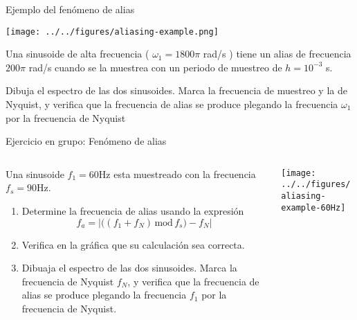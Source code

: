 \documentclass[presentation,aspectratio=169]{beamer}
\begin{document}
\begin{frame}[label={sec:orga9a082d}]{Ejemplo del fenómeno de alias}
\begin{center}
\texttt{[image: ../../figures/aliasing-example.png]}
\end{center}
Una sinusoide de alta frecuencia ( \(\omega_1 = 1800\pi\) rad/s ) tiene un alias de frecuencia  \(200 \pi\) rad/s cuando se la muestrea con un periodo de muestreo de \(h=10^{-3}\) s.

\alert{Dibuja el espectro de las dos sinusoides. Marca la frecuencia de muestreo y la de Nyquist, y verifica que la frecuencia de alias se produce plegando la frecuencia \(\omega_1\) por la frecuencia de Nyquist}
\end{frame}

\begin{frame}[label={sec:org74bef20}]{Ejercicio en grupo: Fenómeno de alias}
\begin{columns}
\begin{column}{0.4\columnwidth}
Una sinusoide \(f_1=60\)Hz esta muestreado con la frecuencia \(f_s=90\)Hz.

\begin{enumerate}
\item Determine la frecuencia de alias usando la expresión
\[ f_a = \left| \big( (f_1 + f_N) \, \text{mod}\, f_s\big) - f_N\right|\]
\item Verifica en la gráfica que su calculación sea correcta.
\item Dibuaja el espectro de las dos sinusoides. Marca la frecuencia de Nyquist \(f_N\), y verifica que la frecuencia de alias se produce plegando la frecuencia \(f_1\) por la frecuencia de Nyquist.
\end{enumerate}
\end{column}

\begin{column}{0.6\columnwidth}
\texttt{[image: ../../figures/aliasing-example-60Hz]}
\end{column}
\end{columns}
\end{frame}
\end{document}
